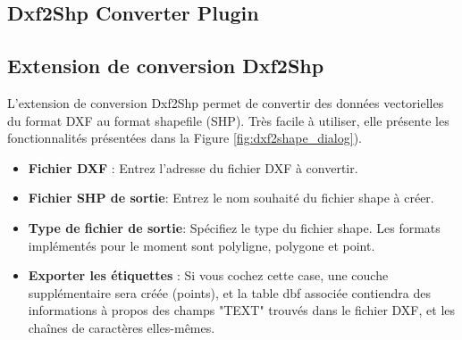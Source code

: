 
\subsection{Dxf2Shp Converter Plugin}
\subsection{Extension de conversion Dxf2Shp}


L'extension de conversion Dxf2Shp permet de convertir des donn\'ees vectorielles du format DXF au format shapefile (SHP).
Tr\`es facile \`a utiliser, elle pr\'esente les fonctionnalit\'es pr\'esent\'ees dans la Figure \ref{fig:dxf2shape_dialog}).

\begin{itemize}
\item \textbf{Fichier DXF} : Entrez l'adresse du fichier DXF \`a convertir.
\item \textbf{Fichier SHP de sortie}: Entrez le nom souhait\'e du fichier shape \`a cr\'eer.
\item \textbf{Type de fichier de sortie}: Sp\'ecifiez le type du fichier shape. Les formats impl\'ement\'es pour le moment sont polyligne, polygone et point.
\item \textbf{Exporter les \'etiquettes} : Si vous cochez cette case, une couche suppl\'ementaire sera cr\'e\'ee (points), et la table dbf associ\'ee contiendra des informations \`a propos des champs "TEXT" trouv\'es dans le fichier DXF, et les cha\^ines de caract\`eres elles-m\^emes.
\end{itemize}

